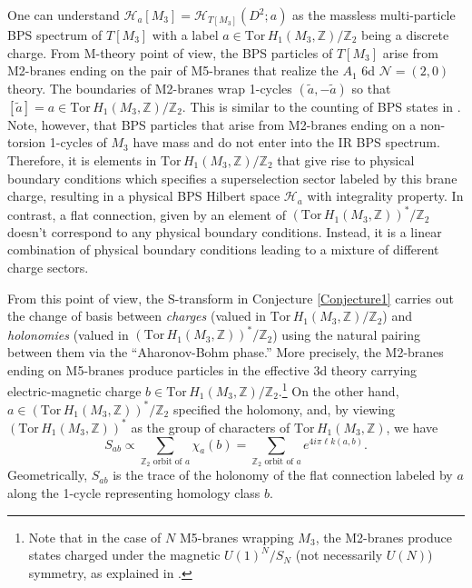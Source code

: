 \documentclass[hyper,letterpaper]{JHEP3}
\newcommand{\be}{\begin{equation}}
\newcommand{\ee}{\end{equation}}
\newcommand{\Z}{{\mathbb Z}}
\def\tilde{\widetilde}
\def\CH{{\mathcal H}}
\def\CN{{\mathcal N}}
\def\lk{{\ell k}}
\def\Tor{{\mathrm{Tor}\,}}
\begin{document}
One can understand $\CH_a[M_3] = \CH_{T[M_3]}(D^2;a)$ as the massless multi-particle BPS spectrum of $T[M_3]$ with a label $a\in \Tor H_1(M_3,\Z)/\Z_2$ being a discrete charge. From M-theory point of view, the BPS particles of $T[M_3]$ arise from M2-branes ending on the pair of M5-branes that realize the $A_1$ 6d $\CN=(2,0)$ theory. The boundaries of M2-branes wrap 1-cycles $(\tilde{a},-\tilde{a})$ so that $[\tilde{a}]=a\in \Tor H_1(M_3,\Z)/\Z_2$. This is similar to the counting of BPS states in \cite{Ooguri:1999bv}. Note, however, that BPS particles that arise from M2-branes ending on a non-torsion 1-cycles of $M_3$ have mass and do not enter into the IR BPS spectrum. Therefore, it is elements in $\Tor H_1(M_3,\Z)/\Z_2$ that give rise to physical boundary conditions which specifies a superselection sector labeled by this brane charge, resulting in a physical BPS Hilbert space $\CH_a$ with integrality property. In contrast, a flat connection, given by an element of $(\Tor H_1(M_3,\Z))^*/\Z_2$ doesn't correspond to any physical boundary conditions. Instead, it is a linear combination of physical boundary conditions leading to a mixture of different charge sectors.


From this point of view, the S-transform in Conjecture \ref{Conjecture1} carries out the change of basis between \emph{charges} (valued in $\Tor H_1(M_3,\Z)/\Z_2$) and \emph{holonomies} (valued in $(\Tor H_1(M_3,\Z))^*/\Z_2$) using the natural pairing between them via the ``Aharonov-Bohm phase.'' More precisely, the M2-branes ending on M5-branes produce particles in the effective 3d theory carrying electric-magnetic charge $b\in \Tor H_1(M_3,\Z)/\Z_2$.\footnote{Note that in the case of $N$ M5-branes wrapping $M_3$, the M2-branes produce states charged under the magnetic $U(1)^N/S_N$ (not necessarily $U(N)$) symmetry, as explained in \cite{Ooguri:1999bv}.} On the other hand, $a\in(\Tor H_1(M_3,\Z))^*/\Z_2$ specified the holomony, and, by viewing $(\Tor H_1(M_3,\Z))^*$ as the group of characters of $\Tor H_1(M_3,\Z)$, we have
\be
S_{ab}\propto\sum_{ \text{$\Z_2$ orbit of $a$} }\chi_a(b)=\sum_{ \text{$\Z_2$ orbit of $a$} }e^{4i\pi \lk(a,b)}.
\ee
Geometrically, $S_{ab}$ is the trace of the holonomy of the flat connection labeled by $a$ along the 1-cycle representing homology class $b$.
\end{document}
